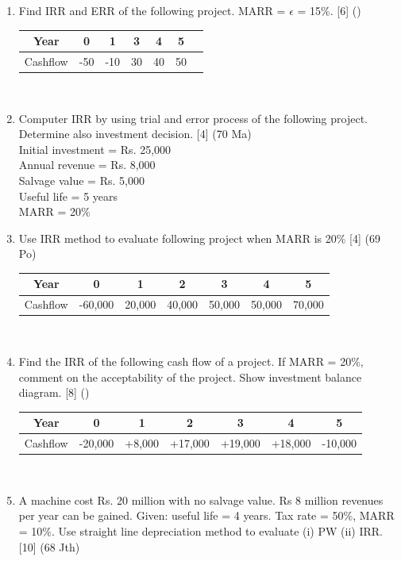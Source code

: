 \documentclass[12pt]{article}
\begin{document}
\begin{enumerate}[noitemsep, topsep = 0pt]
	\item Find IRR and ERR of the following project. MARR = $\epsilon$ = 15\%. \hfill [6] ()
	\begin{tabular}{|c|c|c|c|c|c|c|}
		\hline
		Year & 0 & 1 & 3 & 4 & 5\\ \hline
		Cashflow & -50 & -10 & 30 & 40 & 50\\ \hline
	\end{tabular}\\[0pt]
	
	\item Computer IRR by using trial and error process of the following project. Determine also investment decision. \hfill [4] (70 Ma)\\
	Initial investment = Rs. 25,000\\
	Annual revenue = Rs. 8,000\\
	Salvage value = Rs. 5,000\\
	Useful life = 5 years\\
	MARR = 20\%	
	
	\item Use IRR method to evaluate following project when MARR is 20\% \hfill [4] (69 Po)\\
	\begin{tabular}{|c|c|c|c|c|c|c|}
		\hline
		Year & 0 & 1 & 2 & 3 & 4 & 5\\ \hline
		Cashflow & -60,000 & 20,000 & 40,000 & 50,000 & 50,000 & 70,000\\ \hline
	\end{tabular}\\[0pt]
	
	\item Find the IRR of the following cash flow of a project. If MARR = 20\%, comment on the acceptability of the project. Show investment balance diagram. \hspace{4cm} [8] ()
	\begin{tabular}{|c|c|c|c|c|c|c|}
		\hline
		Year & 0 & 1 & 2 & 3 & 4 & 5\\ \hline
		Cashflow & -20,000 & +8,000 & +17,000 & +19,000 & +18,000 & -10,000\\ \hline
	\end{tabular}\\[0pt]
	
	\item A machine cost Rs. 20 million with no salvage value. Rs 8 million revenues per year can be gained. Given: useful life = 4 years. Tax rate = 50\%, MARR = 10\%. Use straight line depreciation method to evaluate (i) PW (ii) IRR. \hfill [10] (68 Jth)
\end{enumerate}
\end{document}
